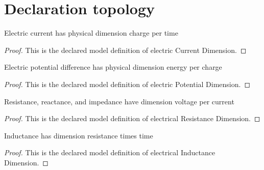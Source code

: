 \section{Declaration topology}
\begin{definition}
  \label{def:physics:phyx-mini-0943:phyxminiproblems-problemphyxmini0943-electriccurrentdimension}
  Electric current has physical dimension charge per time
\end{definition}
\begin{proof}
  This is the declared model definition of electric Current Dimension.
\end{proof}
\begin{definition}
  \label{def:physics:phyx-mini-0943:phyxminiproblems-problemphyxmini0943-electricpotentialdimension}
  Electric potential difference has physical dimension energy per charge
\end{definition}
\begin{proof}
  This is the declared model definition of electric Potential Dimension.
\end{proof}
\begin{definition}
  \label{def:physics:phyx-mini-0943:phyxminiproblems-problemphyxmini0943-electricalresistancedimension}
  Resistance, reactance, and impedance have dimension voltage per current
\end{definition}
\begin{proof}
  This is the declared model definition of electrical Resistance Dimension.
\end{proof}
\begin{definition}
  \label{def:physics:phyx-mini-0943:phyxminiproblems-problemphyxmini0943-electricalinductancedimension}
  Inductance has dimension resistance times time
\end{definition}
\begin{proof}
  This is the declared model definition of electrical Inductance Dimension.
\end{proof}
